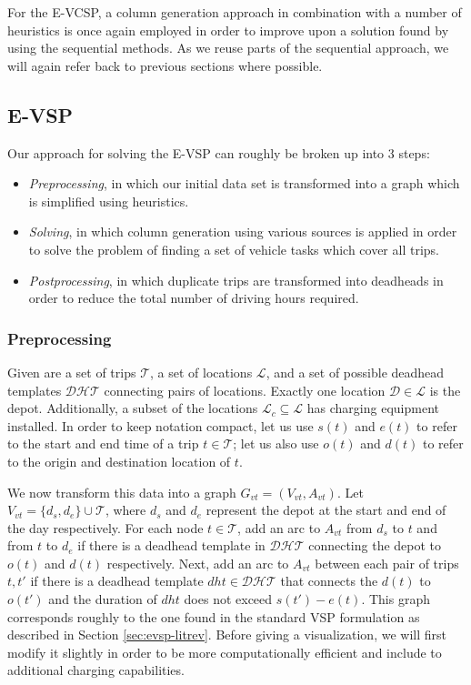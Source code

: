 \documentclass[]{article}
\begin{document}
For the E-VCSP, a column generation approach in combination with a number of heuristics is once again employed in order to improve upon a solution found by using the sequential methods. As we reuse parts of the sequential approach, we will again refer back to previous sections where possible.

\subsection{E-VSP} \label{sec:evsp-methodology}
Our approach for solving the E-VSP can roughly be broken up into 3 steps: 
\begin{itemize}
  \item \textit{Preprocessing}, in which our initial data set is transformed into a graph which is simplified using heuristics.
  \item \textit{Solving}, in which column generation using various sources is applied in order to solve the problem of finding a set of vehicle tasks which cover all trips. 
  \item \textit{Postprocessing}, in which duplicate trips are transformed into deadheads in order to reduce the total number of driving hours required. 
\end{itemize} 
\subsubsection{Preprocessing}
Given are a set of trips $\mathcal{T}$, a set of locations $\mathcal{L}$, and a set of possible deadhead templates $\mathcal{DHT}$ connecting pairs of locations. Exactly one location $\mathcal{D} \in \mathcal{L}$ is the depot. Additionally, a subset of the locations $\mathcal{L}_c \subseteq \mathcal{L}$ has charging equipment installed. In order to keep notation compact, let us use $s(t)$ and $e(t)$ to refer to the start and end time of a trip $t \in \mathcal{T}$; let us also use $o(t)$ and $d(t)$ to refer to the origin and destination location of $t$.

We now transform this data into a graph $G_{vt} = (V_{vt}, A_{vt})$. Let $V_{vt} = \{ d_{s}, d_{e} \} \cup \mathcal{T}$, where $d_{s}$ and $d_{e}$ represent the depot at the start and end of the day respectively. For each node $t \in \mathcal{T}$, add an arc to $A_{vt}$ from $d_{s}$ to $t$ and from $t$ to $d_{e}$ if there is a deadhead template in $\mathcal{DHT}$ connecting the depot to $o(t)$ and $d(t)$ respectively. Next, add an arc to $A_{vt}$ between each pair of trips $t, t'$ if there is a deadhead template $dht \in \mathcal{DHT}$ that connects the $d(t)$ to $o(t')$ and the duration of $dht$ does not exceed $s(t') - e(t)$. This graph corresponds roughly to the one found in the standard VSP formulation as described in Section \ref{sec:evsp-litrev}. Before giving a visualization, we will first modify it slightly in order to be more computationally efficient and include to additional charging capabilities.
\end{document}
